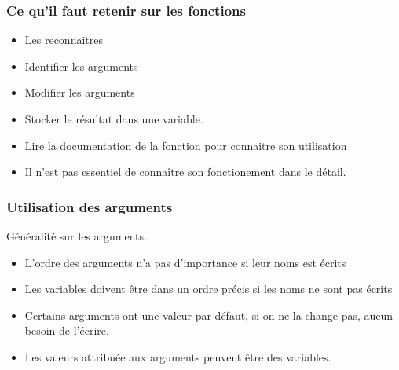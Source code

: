 \documentclass[table,svgnames,hyperref={pdfpagemode=FullScreen}]{beamer}
\begin{document}
\begin{frame}
	\frametitle{Ce qu'il faut retenir sur les fonctions}
	\begin{itemize}
	\item Les reconnaitres
	\item Identifier les arguments 
	\item Modifier les arguments
	\item Stocker le résultat dans une variable.
	\item Lire la documentation de la fonction pour connaitre son utilisation
	\item Il n'est pas essentiel de connaître son fonctionement dans le détail.  
\end{itemize}
\end{frame}
\begin{frame}
	\frametitle{Utilisation des arguments}
	
	Généralité sur les arguments.
	\begin{itemize}
		\item L'ordre des arguments n'a pas d'importance si leur noms est écrits
		\item  Les variables doivent être dans un ordre précis si les noms ne sont pas écrits
		\item  Certains arguments ont une valeur par défaut, si on ne la change pas, aucun besoin de l'écrire.
		\item  Les valeurs attribuée aux arguments peuvent être des variables.
	\end{itemize}
	\end{frame}
		
\end{document}
